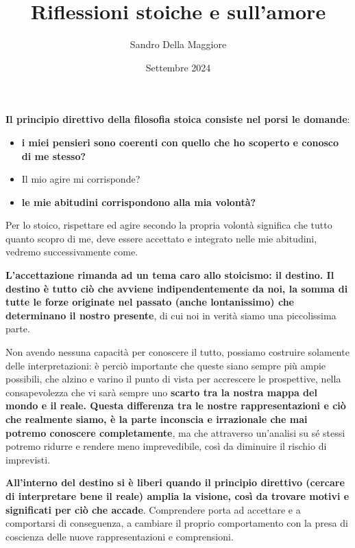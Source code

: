 \documentclass[a4paper,12pt,oneside]{article}%
\begin{document}
	\author{Sandro Della Maggiore}
	\title{Riflessioni stoiche e sull'amore}
	\date{Settembre 2024}
	
	\maketitle


\textbf{Il principio direttivo della filosofia stoica consiste nel porsi le domande}:

\begin{itemize}
	\item \textbf{i miei pensieri sono coerenti con quello che ho scoperto e conosco di me stesso?}
	\item Il mio agire mi corrisponde?
	\item \textbf{le mie abitudini corrispondono alla mia volontà?}
\end{itemize}

Per lo stoico, rispettare ed agire secondo la propria volontà significa che tutto quanto scopro di me, deve essere accettato e integrato nelle mie abitudini, vedremo successivamente come.

\textbf{L'accettazione rimanda ad un tema caro allo stoicismo: il destino. Il destino è tutto ciò che avviene indipendentemente da noi, la somma di tutte le forze originate nel passato (anche lontanissimo) che determinano il nostro presente}, di cui noi in verità siamo una piccolissima parte.

Non avendo nessuna capacità per conoscere il tutto, possiamo costruire solamente delle interpretazioni: è perciò importante che queste siano sempre più ampie possibili, che alzino e varino il punto di vista per accrescere le prospettive, nella consapevolezza che vi sarà sempre uno \textbf{scarto tra la nostra mappa del mondo e il reale. Questa differenza tra le nostre rappresentazioni e ciò che realmente siamo, è la parte inconscia e irrazionale che mai potremo conoscere completamente}, ma che attraverso un'analisi su sé stessi potremo ridurre e rendere meno imprevedibile, così da diminuire il rischio di imprevisti.

\textbf{All'interno del destino si è liberi quando il principio direttivo (cercare di interpretare bene il reale) amplia la visione, così da trovare motivi e significati per ciò che accade}. Comprendere porta ad accettare e a comportarsi di conseguenza, a cambiare il proprio comportamento con la presa di coscienza delle nuove rappresentazioni e comprensioni.
\end{document}
